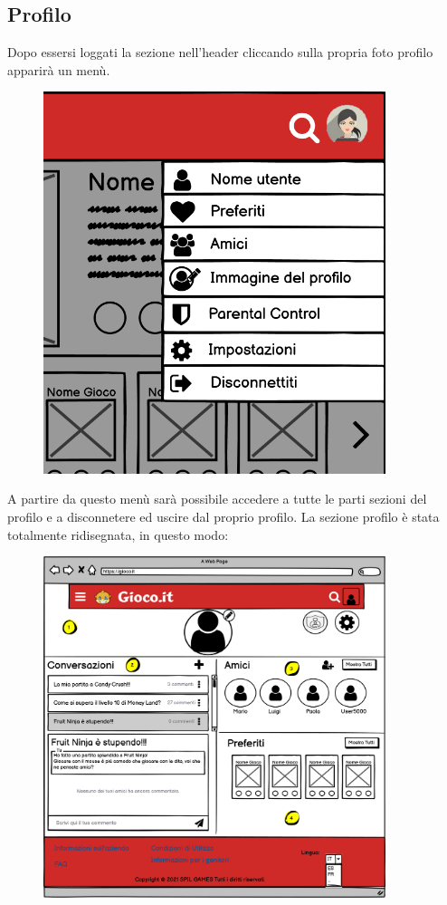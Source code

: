 \documentclass[../Report.tex]{subfiles}
\begin{document}
    \subsection{Profilo}
    Dopo essersi loggati la sezione nell'header cliccando sulla propria foto profilo apparirà un menù.
    \begin{figure}[H]
        \includegraphics[width=10cm]{WProfileMenu.png}
        \centering
    \end{figure}
    A partire da questo menù sarà possibile accedere a tutte le parti sezioni del profilo e a disconnetere ed uscire dal proprio profilo. 
    \label{section: profilo}
    La sezione profilo è stata totalmente ridisegnata, in questo modo:
    \begin{figure}[H]
        \includegraphics[width=10cm]{WProfile.png}
        \centering
    \end{figure}
    
\end{document}
